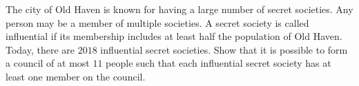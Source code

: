 The city of Old Haven is known for having a large number of secret societies. Any person may be a member of multiple societies. A secret society is called influential if its membership includes at least half the population of Old Haven. Today, there are $2018$ influential secret societies. Show that it is possible to form a council of at most $11$ people such that each influential secret society has at least one member on the council.
